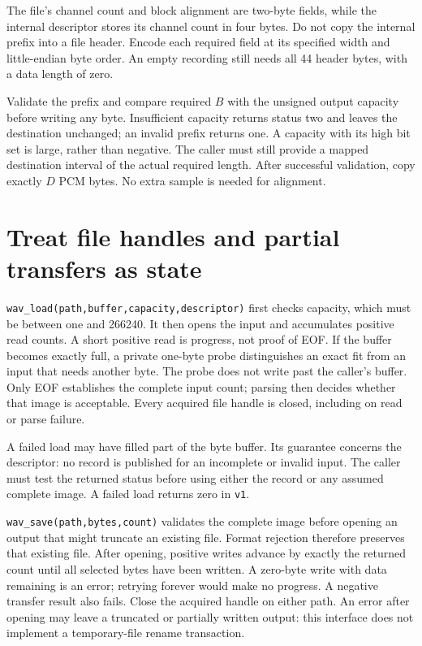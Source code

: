 The file's channel count and block alignment are two-byte fields, while the
internal descriptor stores its channel count in four bytes. Do not copy the
internal prefix into a file header. Encode each required field at its specified
width and little-endian byte order. An empty recording still needs all 44
header bytes, with a data length of zero.

Validate the prefix and compare required $B$ with the unsigned output capacity
before writing any byte. Insufficient capacity returns status two and leaves
the destination unchanged; an invalid prefix returns one. A capacity with its
high bit set is large, rather than negative. The caller must still provide a
mapped destination interval of the actual required length. After successful
validation, copy exactly $D$ PCM bytes. No extra sample is needed for alignment.


\section{Treat file handles and partial transfers as state}

\texttt{wav\_load(path,buffer,capacity,descriptor)} first checks capacity,
which must be between one and 266240. It then opens the input and accumulates
positive read counts. A short positive read is progress, not proof of EOF.
If the buffer becomes exactly full, a private one-byte probe distinguishes
an exact fit from an input that needs another byte. The probe does not write
past the caller's buffer. Only EOF establishes the complete input count;
parsing then decides whether that image is acceptable. Every acquired file
handle is closed, including on read or parse failure.

A failed load may have filled part of the byte buffer. Its guarantee concerns
the descriptor: no record is published for an incomplete or invalid input.
The caller must test the returned status before using either the record or any
assumed complete image. A failed load returns zero in \texttt{v1}.

\texttt{wav\_save(path,bytes,count)} validates the complete image before opening
an output that might truncate an existing file. Format rejection therefore
preserves that existing file. After opening, positive writes advance by exactly
the returned count until all selected bytes have been written. A zero-byte
write with data remaining is an error; retrying forever would make no progress.
A negative transfer result also fails. Close the acquired handle on either path.
An error after opening may leave a truncated or partially written output: this
interface does not implement a temporary-file rename transaction.

